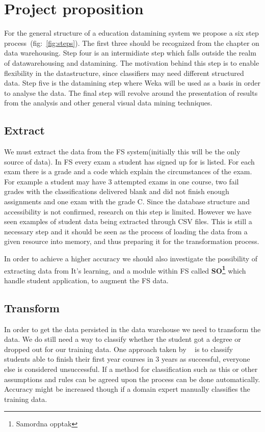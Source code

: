 \chapter{Project proposition}
	For the general structure of a education datamining system we propose 
	a six step process~(fig:~\ref{fig:steps}). 
	The first three should be recognized from the chapter on data warehousing. 
	Step four is an intermidiate step which falls outside the realm of datawarehousing and datamining. 
	The motivation behind this step is to enable flexibility in the datastructure, since classifiers may need different structured data.
	Step five is the datamining step where Weka will be used as a basis
	in order to analyse the data. 
	The final step will revolve around the presentation of results from the analysis and other general visual data mining techniques. 
	

%
\section{Extract}
We must extract the data from the FS system(initially this will be the only source of data).
In FS every exam a student has signed up for is listed.
For each exam there is a grade and a code which explain the circumstances of the exam.
For example a student may have 3 attempted exams in one course, two fail grades with the classifications delivered blank and did not finish enough assignments and one exam with the grade C.
Since the database structure and accessibility is not confirmed, research on this step is limited.
However we have seen examples of student data being extracted through CSV files. 
This is still a necessary step and it should be seen as the process of loading the data from a given resource into memory, and thus preparing it for the transformation process.

\bigskip\noindent
In order to achieve a higher accuracy we should also investigate 
the possibility of extracting data from It's learning, and a module within FS called \textbf{SO\footnote{Samordna opptak}} which handle student application, to augment the FS data.

\section{Transform}
In order to get the data persisted in the data warehouse we need to transform the data.
We do still need a way to classify whether the student got a degree or dropped out for our training data.
One approach taken by ~\cite{7} is to classify students able to finish their first year courses in 3 years as successful,
everyone else is considered unsuccessful.
If a method for classification such as this or other assumptions and rules can be agreed upon the process can be done automatically.
Accuracy might be increased though if a domain expert manually classifies the training data.

